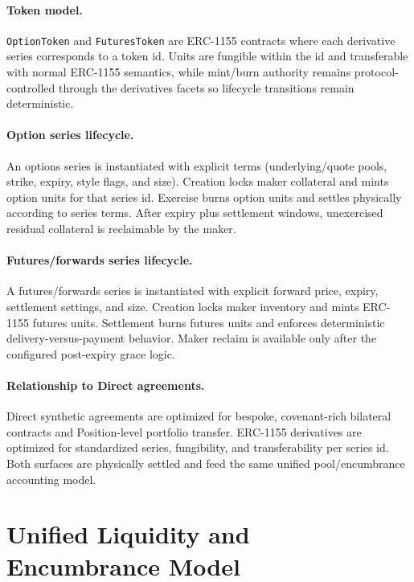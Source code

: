 \documentclass[version=preprint]{iacrcc}
\begin{document}
\paragraph{Token model.}
\texttt{OptionToken} and \texttt{FuturesToken} are ERC-1155 contracts where each derivative series corresponds to a token id. Units are fungible within the id and transferable with normal ERC-1155 semantics, while mint/burn authority remains protocol-controlled through the derivatives facets so lifecycle transitions remain deterministic.

\paragraph{Option series lifecycle.}
An options series is instantiated with explicit terms (underlying/quote pools, strike, expiry, style flags, and size). Creation locks maker collateral and mints option units for that series id. Exercise burns option units and settles physically according to series terms. After expiry plus settlement windows, unexercised residual collateral is reclaimable by the maker.

\paragraph{Futures/forwards series lifecycle.}
A futures/forwards series is instantiated with explicit forward price, expiry, settlement settings, and size. Creation locks maker inventory and mints ERC-1155 futures units. Settlement burns futures units and enforces deterministic delivery-versus-payment behavior. Maker reclaim is available only after the configured post-expiry grace logic.

\paragraph{Relationship to Direct agreements.}
Direct synthetic agreements are optimized for bespoke, covenant-rich bilateral contracts and Position-level portfolio transfer. ERC-1155 derivatives are optimized for standardized series, fungibility, and transferability per series id. Both surfaces are physically settled and feed the same unified pool/encumbrance accounting model.

\section{Unified Liquidity and Encumbrance Model}
\end{document}
